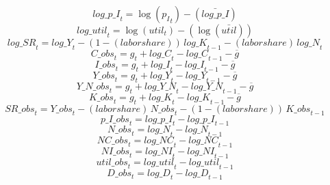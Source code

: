 \begin{dmath}
{log\_p\_I}_{t}=\log\left({{p_I}}_{t}\right)-(\bar{log\_p\_I})
\end{dmath}
\begin{dmath}
{log\_util}_{t}=\log\left({{util}}_{t}\right)-(\log\left(\bar{{util}}\right))
\end{dmath}
\begin{dmath}
{log\_SR}_{t}={log\_Y}_{t}-\left(1-{(labor share)}\right)\, {log\_K}_{t-1}-{(labor share)}\, {log\_N}_{t}
\end{dmath}
\begin{dmath}
{C\_obs}_{t}={{g}}_{t}+{log\_C}_{t}-{log\_C}_{t-1}-{{\overline{g}}}
\end{dmath}
\begin{dmath}
{I\_obs}_{t}={{g}}_{t}+{log\_I}_{t}-{log\_I}_{t-1}-{{\overline{g}}}
\end{dmath}
\begin{dmath}
{Y\_obs}_{t}={{g}}_{t}+{log\_Y}_{t}-{log\_Y}_{t-1}-{{\overline{g}}}
\end{dmath}
\begin{dmath}
{Y\_N\_obs}_{t}={{g}}_{t}+{log\_Y\_N}_{t}-{log\_Y\_N}_{t-1}-{{\overline{g}}}
\end{dmath}
\begin{dmath}
{K\_obs}_{t}={{g}}_{t}+{log\_K}_{t}-{log\_K}_{t-1}-{{\overline{g}}}
\end{dmath}
\begin{dmath}
{SR\_obs}_{t}={Y\_obs}_{t}-{(labor share)}\, {N\_obs}_{t}-\left(1-{(labor share)}\right)\, {K\_obs}_{t-1}
\end{dmath}
\begin{dmath}
{p\_I\_obs}_{t}={log\_p\_I}_{t}-{log\_p\_I}_{t-1}
\end{dmath}
\begin{dmath}
{N\_obs}_{t}={log\_N}_{t}-{log\_N}_{t-1}
\end{dmath}
\begin{dmath}
{NC\_obs}_{t}={log\_NC}_{t}-{log\_NC}_{t-1}
\end{dmath}
\begin{dmath}
{NI\_obs}_{t}={log\_NI}_{t}-{log\_NI}_{t-1}
\end{dmath}
\begin{dmath}
{util\_obs}_{t}={log\_util}_{t}-{log\_util}_{t-1}
\end{dmath}
\begin{dmath}
{D\_obs}_{t}={log\_D}_{t}-{log\_D}_{t-1}
\end{dmath}
